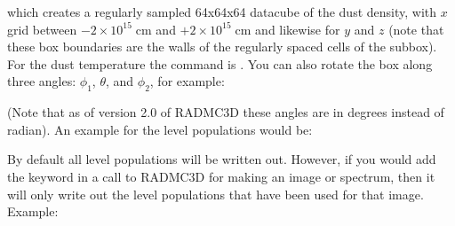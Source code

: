 \documentclass[letterpaper,10pt,english]{sphinxmanual}
\begin{document}
which creates a regularly sampled 64x64x64 datacube of the dust density, with \(x\) grid
between \(-2\times 10^{15}\;\mathrm{cm}\) and  \(+2\times 10^{15}\;\mathrm{cm}\) and
likewise for \(y\) and \(z\) (note that these box boundaries are the walls of the
regularly spaced cells of the subbox). For the dust temperature the command is
. You can also rotate the box along three angles:
\(\phi_1\), \(\theta\), and \(\phi_2\), for example:

\begin{sphinxVerbatim}[commandchars=\\\{\}]
                   
\end{sphinxVerbatim}

(Note that as of version 2.0 of RADMC\sphinxhyphen{}3D these angles are in degrees instead of radian).
An example for the level populations would be:

\begin{sphinxVerbatim}[commandchars=\\\{\}]
            
\end{sphinxVerbatim}

 By default all level populations will
be written out. However, if you would add the  keyword in a
call to RADMC\sphinxhyphen{}3D for making an image or spectrum, then it will only write out
the level populations that have been used for that image. Example:

\begin{sphinxVerbatim}[commandchars=\\\{\}]
               
\end{sphinxVerbatim}
\end{document}
